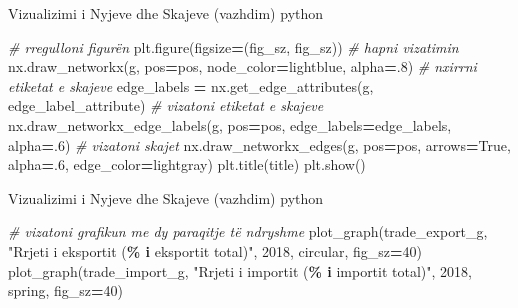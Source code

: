 \documentclass[
  ignorenonframetext,
]{beamer}
\newenvironment{Shaded}{\begin{snugshade}}{\end{snugshade}}
\newcommand{\CommentTok}[1]{\textcolor[rgb]{0.56,0.35,0.01}{\textit{#1}}}
\newcommand{\DecValTok}[1]{\textcolor[rgb]{0.00,0.00,0.81}{#1}}
\newcommand{\FloatTok}[1]{\textcolor[rgb]{0.00,0.00,0.81}{#1}}
\newcommand{\NormalTok}[1]{#1}
\newcommand{\OperatorTok}[1]{\textcolor[rgb]{0.81,0.36,0.00}{\textbf{#1}}}
\newcommand{\SpecialCharTok}[1]{\textcolor[rgb]{0.81,0.36,0.00}{\textbf{#1}}}
\newcommand{\StringTok}[1]{\textcolor[rgb]{0.31,0.60,0.02}{#1}}
\newcommand{\VariableTok}[1]{\textcolor[rgb]{0.00,0.00,0.00}{#1}}
\begin{document}
\begin{frame}[fragile]{Vizualizimi i Nyjeve dhe Skajeve (vazhdim)}
\protect\hypertarget{vizualizimi-i-nyjeve-dhe-skajeve-vazhdim}{}
python

\begin{Shaded}
\begin{Highlighting}[]
    \CommentTok{\# rregulloni figurën}
\NormalTok{    plt.figure(figsize}\OperatorTok{=}\NormalTok{(fig\_sz, fig\_sz))}
    \CommentTok{\# hapni vizatimin}
\NormalTok{    nx.draw\_networkx(g, pos}\OperatorTok{=}\NormalTok{pos, node\_color}\OperatorTok{=}\StringTok{\textquotesingle{}lightblue\textquotesingle{}}\NormalTok{, alpha}\OperatorTok{=}\FloatTok{.8}\NormalTok{)}
    \CommentTok{\# nxirrni etiketat e skajeve}
\NormalTok{    edge\_labels }\OperatorTok{=}\NormalTok{ nx.get\_edge\_attributes(g, edge\_label\_attribute)}
    \CommentTok{\# vizatoni etiketat e skajeve}
\NormalTok{    nx.draw\_networkx\_edge\_labels(g, pos}\OperatorTok{=}\NormalTok{pos, edge\_labels}\OperatorTok{=}\NormalTok{edge\_labels, alpha}\OperatorTok{=}\FloatTok{.6}\NormalTok{)}
    \CommentTok{\# vizatoni skajet}
\NormalTok{    nx.draw\_networkx\_edges(g, pos}\OperatorTok{=}\NormalTok{pos, arrows}\OperatorTok{=}\VariableTok{True}\NormalTok{, alpha}\OperatorTok{=}\FloatTok{.6}\NormalTok{, edge\_color}\OperatorTok{=}\StringTok{\textquotesingle{}lightgray\textquotesingle{}}\NormalTok{)}
\NormalTok{    plt.title(title)}
\NormalTok{    plt.show()}
\end{Highlighting}
\end{Shaded}
\end{frame}

\begin{frame}[fragile]{Vizualizimi i Nyjeve dhe Skajeve (vazhdim)}
\protect\hypertarget{vizualizimi-i-nyjeve-dhe-skajeve-vazhdim-1}{}
python

\begin{Shaded}
\begin{Highlighting}[]
\CommentTok{\# vizatoni grafikun me dy paraqitje të ndryshme}
\NormalTok{plot\_graph(trade\_export\_g, }\StringTok{"Rrjeti i eksportit (}\SpecialCharTok{\% i}\StringTok{ eksportit total)"}\NormalTok{, }\StringTok{\textquotesingle{}2018\textquotesingle{}}\NormalTok{, }\StringTok{\textquotesingle{}circular\textquotesingle{}}\NormalTok{, fig\_sz}\OperatorTok{=}\DecValTok{40}\NormalTok{)}
\NormalTok{plot\_graph(trade\_import\_g, }\StringTok{"Rrjeti i importit (}\SpecialCharTok{\% i}\StringTok{ importit total)"}\NormalTok{, }\StringTok{\textquotesingle{}2018\textquotesingle{}}\NormalTok{, }\StringTok{\textquotesingle{}spring\textquotesingle{}}\NormalTok{, fig\_sz}\OperatorTok{=}\DecValTok{40}\NormalTok{)}
\end{Highlighting}
\end{Shaded}
\end{frame}
\end{document}
